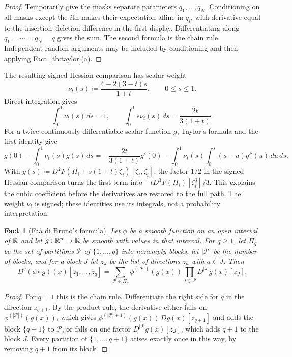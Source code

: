 \documentclass[11pt,letterpaper]{article}
\theoremstyle{plain}
\newtheorem{fact}{Fact}[section]
\begin{document}
\begin{proof}
Temporarily give the masks separate parameters \(q_1,\ldots,q_N\).
Conditioning on all masks except the \(i\)th makes their expectation
affine in \(q_i\), with derivative equal to the insertion--deletion
difference in the first display. Differentiating along
\(q_1=\cdots=q_N=q\) gives the sum. The second formula is the chain
rule. Independent random arguments may be included by conditioning
and then applying Fact~\ref{tb:taylor}(a).
\end{proof}


The resulting signed Hessian comparison has scalar weight
\[
 \nu_t(s)\coloneqq \frac{4-2(3-t)s}{1+t},\qquad 0\le s\le1.
\]
Direct integration gives
\[
 \int_0^1\nu_t(s)\,ds=1,\qquad
 \int_0^1s\nu_t(s)\,ds=\frac{2t}{3(1+t)}.
\]
For a twice continuously differentiable scalar function \(g\),
Taylor's formula and the first identity give
\[
 g(0)-\int_0^1\nu_t(s)g(s)\,ds
 =-\frac{2t}{3(1+t)}g'(0)
   -\int_0^1\nu_t(s)\int_0^s(s-u)g''(u)\,du\,ds.
\]
With \(g(s)\coloneqq D^2F(H_i+s(1+t)\zeta_i)[\zeta_i,\zeta_i]\),
the factor \(1/2\) in the signed Hessian comparison turns the first
term into \(-t D^3F(H_i)[\zeta_i^3]/3\). This explains the
cubic coefficient before the derivatives are restored to the full path.
The weight \(\nu_t\) is signed; these identities use its
integrals, not a probability interpretation.

\begin{fact}[Fa\`a di Bruno's formula]\label{tb:faa}
Let \(\phi\) be a smooth function on an open interval of \(\mathbb R\) and let
\(g:\mathbb R^n\to\mathbb R\) be smooth with values in that interval. For \(q\ge1\), let
\(\Pi_q\) be the set of partitions \(\mathcal P\) of \(\{1,\ldots,q\}\) into
nonempty blocks, let \(|\mathcal P|\) be the number of blocks, and for a
block \(J\) let \(z_J\) be the list of directions \(z_a\) with
\(a\in J\). Then
\[
 D^q(\phi\circ g)(x)[z_1,\ldots,z_q]
 =\sum_{\mathcal P\in\Pi_q}\phi^{(|\mathcal P|)}(g(x))
  \prod_{J\in\mathcal P}D^{|J|}g(x)[z_J].
\]
\end{fact}

\begin{proof}
For \(q=1\) this is the chain rule. Differentiate the right side for \(q\)
in the direction \(z_{q+1}\). By the product rule, the derivative either
falls on \(\phi^{(|\mathcal P|)}(g(x))\), which gives
\(\phi^{(|\mathcal P|+1)}(g(x))\,Dg(x)[z_{q+1}]\) and adds the block
\(\{q+1\}\) to \(\mathcal P\), or falls on one factor
\(D^{|J|}g(x)[z_J]\), which adds \(q+1\) to the block \(J\). Every partition
of \(\{1,\ldots,q+1\}\) arises exactly once in this way, by removing
\(q+1\) from its block.
\end{proof}
\end{document}
